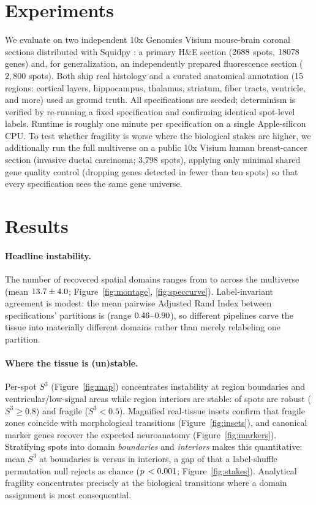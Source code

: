 \section{Experiments}
We evaluate on two independent 10x Genomics Visium mouse-brain coronal sections distributed
with Squidpy \citep{palla2022squidpy}: a primary H\&E section ($2688{}$ spots,
$18078{}$ genes) and, for generalization, an independently prepared fluorescence section
($2{,}800$ spots). Both ship real histology and a curated anatomical annotation (15 regions:
cortical layers, hippocampus, thalamus, striatum, fiber tracts, ventricle, and more) used as
ground truth. All \Nspecs{} specifications are seeded; determinism is verified by re-running a
fixed specification and confirming identical spot-level labels. Runtime is roughly one minute
per specification on a single Apple-silicon CPU. To test whether fragility is worse where the
biological stakes are higher, we additionally run the full multiverse on a public 10x Visium
human breast-cancer section (invasive ductal carcinoma; 3{,}798 spots), applying only minimal
shared gene quality control (dropping genes detected in fewer than ten spots) so that every
specification sees the same gene universe.

\section{Results}
\label{sec:results}
\paragraph{Headline instability.} The number of recovered spatial domains ranges from
\ClustMin{} to \ClustMax{} across the multiverse (mean $13.7{} \pm 4.0{}$;
Figure~\ref{fig:montage}, \ref{fig:speccurve}). Label-invariant agreement is modest: the mean
pairwise Adjusted Rand Index between specifications' partitions is \AriMean{} (range
$0.46{}$--$0.90{}$), so different pipelines carve the tissue into materially different
domains rather than merely relabeling one partition.

\paragraph{Where the tissue is (un)stable.} Per-spot $S^3$ (Figure~\ref{fig:map}) concentrates
instability at region boundaries and ventricular/low-signal areas while region interiors are
stable: \SpotStableFrac{} of spots are robust ($S^3 \ge 0.8$) and \SpotFragileFrac{} fragile
($S^3 < 0.5$). Magnified real-tissue insets confirm that fragile zones coincide with
morphological transitions (Figure~\ref{fig:insets}), and canonical marker genes recover the
expected neuroanatomy (Figure~\ref{fig:markers}). Stratifying spots into domain
\emph{boundaries} and \emph{interiors} makes this quantitative: mean $S^3$ at boundaries is
\BoundaryS{} versus \InteriorS{} in interiors, a gap of \StakesGap{} that a label-shuffle
permutation null rejects as chance ($p\,<0.001{}$; Figure~\ref{fig:stakes}). Analytical
fragility concentrates precisely at the biological transitions where a domain assignment is
most consequential.

